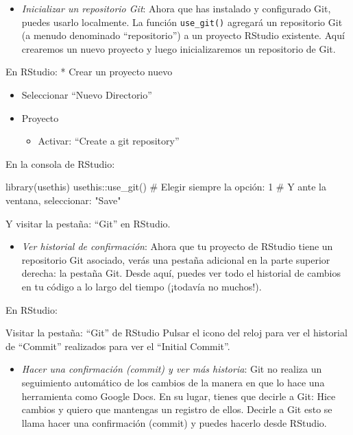 \documentclass[
  letterpaper,
  DIV=11,
  numbers=noendperiod]{scrreprt}
\newenvironment{Shaded}{\begin{snugshade}}{\end{snugshade}}
\newcommand{\CommentTok}[1]{\textcolor[rgb]{0.37,0.37,0.37}{#1}}
\newcommand{\FunctionTok}[1]{\textcolor[rgb]{0.28,0.35,0.67}{#1}}
\newcommand{\NormalTok}[1]{\textcolor[rgb]{0.00,0.23,0.31}{#1}}
\newcommand{\SpecialCharTok}[1]{\textcolor[rgb]{0.37,0.37,0.37}{#1}}
\providecommand{\tightlist}{%
  \setlength{\itemsep}{0pt}\setlength{\parskip}{0pt}}\usepackage{longtable,booktabs,array}
\begin{document}
\begin{itemize}
\tightlist
\item
  {\emph{Inicializar un repositorio Git}}: Ahora que has instalado y
  configurado Git, puedes usarlo localmente. La función
  \texttt{use\_git()} agregará un repositorio Git (a menudo denominado
  ``repositorio'') a un proyecto RStudio existente. Aquí crearemos un
  nuevo proyecto y luego inicializaremos un repositorio de Git.
\end{itemize}

En RStudio: * Crear un proyecto nuevo

\begin{itemize}
\item
  Seleccionar ``Nuevo Directorio''
\item
  Proyecto

  \begin{itemize}
  \tightlist
  \item
    Activar: ``Create a git repository''
  \end{itemize}
\end{itemize}

En la consola de RStudio:

\begin{Shaded}
\begin{Highlighting}[]
\FunctionTok{library}\NormalTok{(usethis)}
\NormalTok{usethis}\SpecialCharTok{::}\FunctionTok{use\_git}\NormalTok{()}
\CommentTok{\# Elegir siempre la opción: 1}
\CommentTok{\# Y ante la ventana, seleccionar: "Save"}
\end{Highlighting}
\end{Shaded}

Y visitar la pestaña: ``Git'' en RStudio.

\begin{itemize}
\tightlist
\item
  {\emph{Ver historial de confirmación}}: Ahora que tu proyecto de
  RStudio tiene un repositorio Git asociado, verás una pestaña adicional
  en la parte superior derecha: la pestaña Git. Desde aquí, puedes ver
  todo el historial de cambios en tu código a lo largo del tiempo
  (¡todavía no muchos!).
\end{itemize}

En RStudio:

Visitar la pestaña: ``Git'' de RStudio Pulsar el icono del reloj para
ver el historial de ``Commit'' realizados para ver el ``Initial
Commit''.

\begin{itemize}
\tightlist
\item
  {\emph{Hacer una confirmación (commit) y ver más historia}}: Git no
  realiza un seguimiento automático de los cambios de la manera en que
  lo hace una herramienta como Google Docs. En su lugar, tienes que
  decirle a Git: Hice cambios y quiero que mantengas un registro de
  ellos. Decirle a Git esto se llama hacer una confirmación (commit) y
  puedes hacerlo desde RStudio.
\end{itemize}
\end{document}
